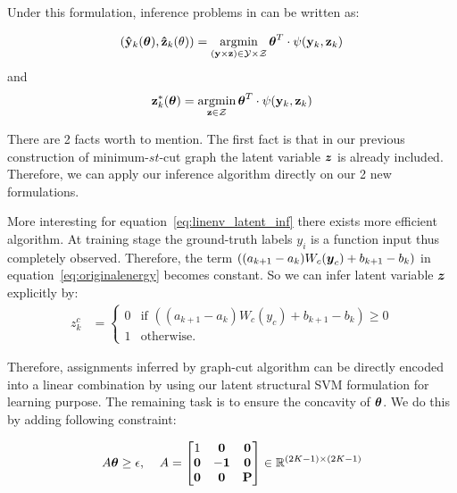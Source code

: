 \documentclass[sigconf,anonymous,review]{acmart}
\renewcommand{\cite}{\citep}
\begin{document}
Under this formulation, inference problems in
\cite{yu2009learning} can be written as:

\begin{align}
  \label{eq:linenv_full_inf}
  (\mathbf{\hat{y}}_k(\boldsymbol{\theta}),\mathbf{\hat{z}}_k(\theta))=\mathop{\textrm{argmin}}_{(\mathbf{y}
  \times \mathbf{z}) \in \mathcal{Y} \times \mathcal{Z}}
  \boldsymbol{\theta}^T\cdot\psi(\mathbf{y}_k,\mathbf{z}_k)
\end{align}
and
\begin{align}
  \label{eq:linenv_latent_inf}
  \mathbf{z}^*_k(\boldsymbol{\theta}) = \mathop{\textrm{argmin}}_{\mathbf{z} \in \mathcal{Z}}
  \boldsymbol{\theta}^T \cdot \psi(\mathbf{y}_k,\mathbf{z}_k)
\end{align}

There are 2 facts worth to mention. The first fact is
that in our previous construction of minimum-$st$-cut graph the
latent variable ${\boldsymbol{z}}$ is already included. Therefore, we can
apply our inference algorithm directly on our 2 new formulations.

More interesting for equation~\eqref{eq:linenv_latent_inf} there exists
more efficient algorithm. At training stage the ground-truth
labels $y_i$ is a function input thus completely observed.
Therefore, the term $((a_{k+1}-a_k)W_c({\boldsymbol{y}}_c)+b_{k+1}-b_k)$ in
equation~\eqref{eq:originalenergy} becomes constant. So we can
infer latent variable ${\boldsymbol{z}}$ explicitly by:
\begin{align}
  \label{eq:linenv_effi_infer_latent}
  z_k^c &=
          \begin{cases}
            0 & \text{if $((a_{k+1}-a_k)W_c(y_c)+b_{k+1}-b_k)\geq0$} \\
            1 & \text{otherwise}.
          \end{cases}
\end{align}

Therefore, assignments inferred by graph-cut algorithm can be
directly encoded into a linear combination by using our latent
structural SVM formulation for learning purpose. The remaining
task is to ensure the concavity of $\boldsymbol{\theta}$. We do this by
adding following constraint:

\begin{align}
  \label{eq:concave_constraint}
  A\boldsymbol{\theta}\geq\epsilon \text{,\;~~~} A=
                  \begin{bmatrix}
                    1 & \mathbf{0} & \mathbf{0}\\
                    \mathbf{0} & -\mathbf{1} & \mathbf{0}\\
                    \mathbf{0} & \mathbf{0} & \mathbf{P}
                  \end{bmatrix}\in \mathbb{R}^{(2K-1)\times(2K-1)}
\end{align}
\end{document}
